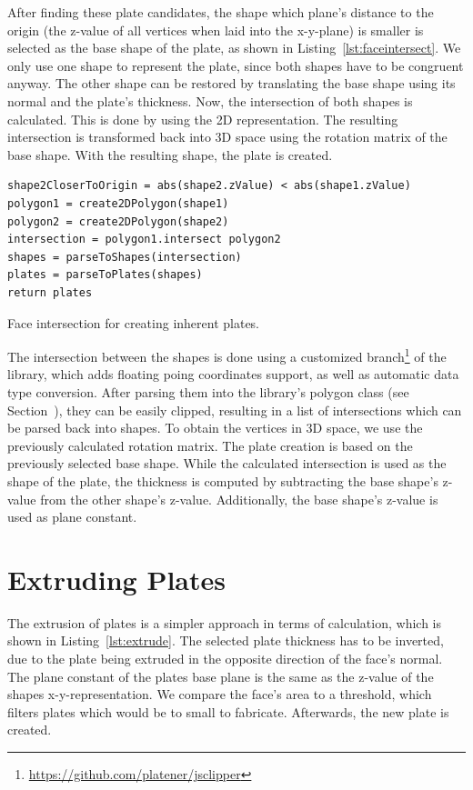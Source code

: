 \documentclass[../ClassicThesis.tex]{subfiles}
\begin{document}
After finding these plate candidates, the shape which plane's distance to the origin (the z-value of all vertices when laid into the x-y-plane) is smaller is selected as the base shape of the plate, as shown in Listing~\ref{lst:faceintersect}. We only use one shape to represent the plate, since both shapes have to be congruent anyway. The other shape can be restored by translating the base shape using its normal and the plate's thickness. Now, the intersection of both shapes is calculated. This is done by using the 2D representation. The resulting intersection is transformed back into 3D space using the rotation matrix of the base shape. With the resulting shape, the plate is created.

\begin{listing}
\begin{verbatim}
shape2CloserToOrigin = abs(shape2.zValue) < abs(shape1.zValue)
polygon1 = create2DPolygon(shape1)
polygon2 = create2DPolygon(shape2)
intersection = polygon1.intersect polygon2
shapes = parseToShapes(intersection)
plates = parseToPlates(shapes)
return plates
\end{verbatim}
\caption{Face intersection for creating inherent plates.}
\label{lst:faceintersect}
\end{listing}

The intersection between the shapes is done using a customized branch\footnote{\url{https://github.com/platener/jsclipper}} of the {\jsclipper} library, which adds floating poing coordinates support, as well as automatic data type conversion. After parsing them into the library's polygon class (see Section~), they can be easily clipped, resulting in a list of intersections which can be parsed back into shapes. To obtain the vertices in 3D space, we use the previously calculated rotation matrix. The plate creation is based on the previously selected base shape. While the calculated intersection is used as the shape of the plate, the thickness is computed by subtracting the base shape's z-value from the other shape's z-value. Additionally, the base shape's z-value is used as plane constant.

\section{Extruding Plates}\label{sec:extrudedplates}

The extrusion of plates is a simpler approach in terms of calculation, which is shown in Listing~\ref{lst:extrude}. The selected plate thickness has to be inverted, due to the plate being extruded in the opposite direction of the face's normal. The plane constant of the plates base plane is the same as the z-value of the shapes x-y-representation. We compare the face's area to a threshold, which filters plates which would be to small to fabricate. Afterwards, the new plate is created.
\end{document}
